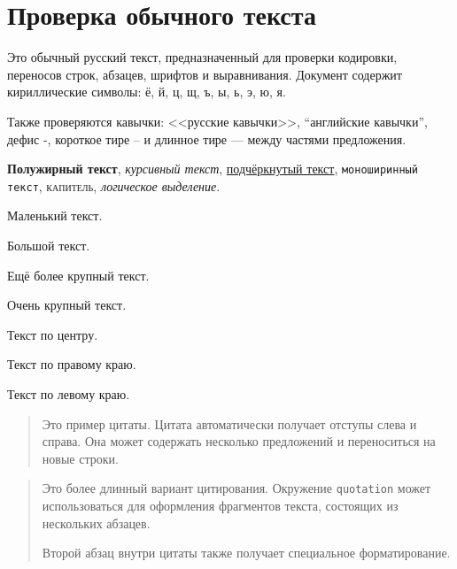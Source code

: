 \documentclass[12pt,a4paper]{article}
\theoremstyle{definition}
\theoremstyle{remark}
\begin{document}
\tableofcontents
\newpage

\listoffigures
\listoftables
\newpage


\section{Проверка обычного текста}

Это обычный русский текст, предназначенный для проверки кодировки,
переносов строк, абзацев, шрифтов и выравнивания. Документ содержит
кириллические символы: ё, й, ц, щ, ъ, ы, ь, э, ю, я.

Также проверяются кавычки: <<русские кавычки>>, ``английские кавычки'',
дефис -, короткое тире -- и длинное тире --- между частями предложения.

\textbf{Полужирный текст},
\textit{курсивный текст},
\underline{подчёркнутый текст},
\texttt{моноширинный текст},
\textsc{капитель},
\emph{логическое выделение}.

{\small Маленький текст.}

{\large Большой текст.}

{\Large Ещё более крупный текст.}

{\huge Очень крупный текст.}

\begin{center}
    Текст по центру.
\end{center}

\begin{flushright}
    Текст по правому краю.
\end{flushright}

\begin{flushleft}
    Текст по левому краю.
\end{flushleft}

\begin{quote}
Это пример цитаты. Цитата автоматически получает отступы слева и справа.
Она может содержать несколько предложений и переноситься на новые строки.
\end{quote}

\begin{quotation}
Это более длинный вариант цитирования. Окружение \texttt{quotation}
может использоваться для оформления фрагментов текста, состоящих из
нескольких абзацев.

Второй абзац внутри цитаты также получает специальное форматирование.
\end{quotation}
\end{document}
